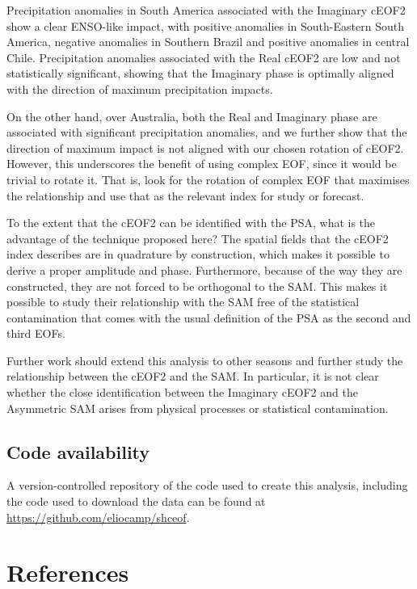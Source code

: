 \documentclass[smallextended]{svjour3}       %
\begin{document}
Precipitation anomalies in South America associated with the Imaginary cEOF2 show a clear ENSO-like impact, with positive anomalies in South-Eastern South America, negative anomalies in Southern Brazil and positive anomalies in central Chile.
Precipitation anomalies associated with the Real cEOF2 are low and not statistically significant, showing that the Imaginary phase is optimally aligned with the direction of maximum precipitation impacts.

On the other hand, over Australia, both the Real and Imaginary phase are associated with significant precipitation anomalies, and we further show that the direction of maximum impact is not aligned with our chosen rotation of cEOF2.
However, this underscores the benefit of using complex EOF, since it would be trivial to rotate it.
That is, look for the rotation of complex EOF that maximises the relationship and use that as the relevant index for study or forecast.

To the extent that the cEOF2 can be identified with the PSA, what is the advantage of the technique proposed here?
The spatial fields that the cEOF2 index describes are in quadrature by construction, which makes it possible to derive a proper amplitude and phase.
Furthermore, because of the way they are constructed, they are not forced to be orthogonal to the SAM.
This makes it possible to study their relationship with the SAM free of the statistical contamination that comes with the usual definition of the PSA as the second and third EOFs.

Further work should extend this analysis to other seasons and further study the relationship between the cEOF2 and the SAM.
In particular, it is not clear whether the close identification between the Imaginary cEOF2 and the Asymmetric SAM arises from physical processes or statistical contamination.

\hypertarget{code-availability}{%
\subsection*{Code availability}\label{code-availability}}

A version-controlled repository of the code used to create this analysis, including the code used to download the data can be found at \url{https://github.com/eliocamp/shceof}.

\hypertarget{references}{%
\section{References}\label{references}}




\end{document}
